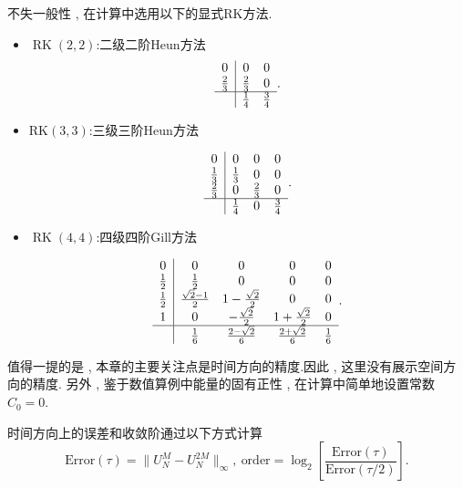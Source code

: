 不失一般性 , 在计算中选用以下的显式RK方法\cite{shuEfficientImplementationEssentially1988}.
\begin{itemize}
\item $\operatorname{RK}(2 , 2)$:二级二阶Heun方法%
\begin{equation}
\begin{array}{c|cc}
0 & 0 & 0 \\
\frac{2}{3} & \frac{2}{3} & 0 \\
\hline & \frac{1}{4} & \frac{3}{4}
\end{array}.
\end{equation}
	
\item $\mathrm{RK}(3 , 3)$:三级三阶Heun方法%
	
\begin{equation}
\begin{array}{c|ccc}
0 & 0 & 0 & 0 \\
\frac{1}{3} & \frac{1}{3} & 0 & 0 \\
\frac{2}{3} & 0 & \frac{2}{3} & 0 \\
\hline & \frac{1}{4} & 0 & \frac{3}{4}
\end{array}.
\end{equation}
		
\item $\operatorname{RK}(4 , 4)$:四级四阶Gill方法%
		
\begin{equation}
\begin{array}{c|cccc}
0 & 0 & 0 & 0 & 0 \\
\frac{1}{2} & \frac{1}{2} & 0 & 0 & 0 \\
\frac{1}{2} & \frac{\sqrt{2}-1}{2} & 1-\frac{\sqrt{2}}{2} & 0 & 0 \\
1 & 0 & -\frac{\sqrt{2}}{2} & 1+\frac{\sqrt{2}}{2} & 0 \\
\hline & \frac{1}{6} & \frac{2-\sqrt{2}}{6} & \frac{2+\sqrt{2}}{6} & \frac{1}{6}
\end{array}.
\end{equation}
\end{itemize}

值得一提的是 , 本章的主要关注点是时间方向的精度.因此 , 这里没有展示空间方向的精度.
另外 , 鉴于数值算例中能量的固有正性 , 在计算中简单地设置常数$C_0=0$.

时间方向上的误差和收敛阶通过以下方式计算
\begin{equation}
	\text{Error}(\tau) = \|U_{N}^{M} - U_{N}^{2 M}\|_{\infty} , ~\text{order} = \log_{2}\left[\frac{\text{Error}(\tau)}{\text{Error}(\tau / 2)}\right].\label{eq_SAVRRK:104}
\end{equation}

